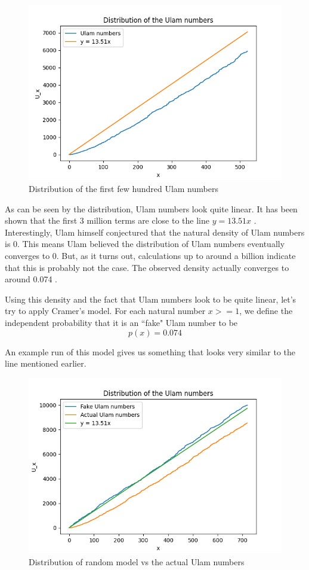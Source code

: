 \documentclass[conference]{IEEEtran}
\begin{document}
\begin{figure}[H]
  \centering
  \includegraphics[width=\linewidth,keepaspectratio]{../images/Figure_3.png}
  \caption{Distribution of the first few hundred Ulam numbers}
\end{figure}

As can be seen by the distribution, Ulam numbers look quite linear. It has been shown that the first 3 million terms are close to the line $y = 13.51x$ \cite{b2}. Interestingly, Ulam himself conjectured that the natural density of Ulam numbers is 0. This means Ulam believed the distribution of Ulam numbers eventually converges to 0. But, as it turns out, calculations up to around a billion indicate that this is probably not the case. The observed density actually converges to around 0.074 \cite{b2}. 

Using this density and the fact that Ulam numbers look to be quite linear, let's try to apply Cramer's model. For each natural number $x >= 1$, we define the independent probability that it is an ``fake" Ulam number to be \[p(x) = 0.074\]

An example run of this model gives us something that looks very similar to the line mentioned earlier.

\begin{figure}[H]
  \centering
  \includegraphics[width=\linewidth,keepaspectratio]{../images/fake_ulam.png}
  \caption{Distribution of random model vs the actual Ulam numbers}
\end{figure}
\end{document}
